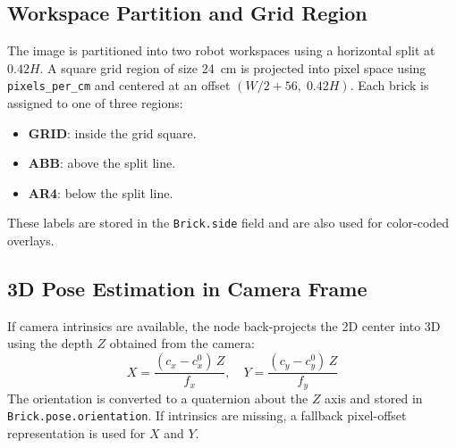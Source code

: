 \subsection{Workspace Partition and Grid Region}
The image is partitioned into two robot workspaces using a horizontal split at $0.42H$. A square grid region of size 24~cm is projected into pixel space using \texttt{pixels\_per\_cm} and centered at an offset $(W/2 + 56, \; 0.42H)$. Each brick is assigned to one of three regions:
\begin{itemize}
    \item \textbf{GRID}: inside the grid square.
    \item \textbf{ABB}: above the split line.
    \item \textbf{AR4}: below the split line.
\end{itemize}
These labels are stored in the \texttt{Brick.side} field and are also used for color-coded overlays.

\subsection{3D Pose Estimation in Camera Frame}
If camera intrinsics are available, the node back-projects the 2D center into 3D using the depth $Z$ obtained from the camera:
$$
X = \frac{(c_x - c_x^0) \, Z}{f_x}, \quad
Y = \frac{(c_y - c_y^0) \, Z}{f_y}
$$
The orientation is converted to a quaternion about the $Z$ axis and stored in \texttt{Brick.pose.orientation}. If intrinsics are missing, a fallback pixel-offset representation is used for $X$ and $Y$.
